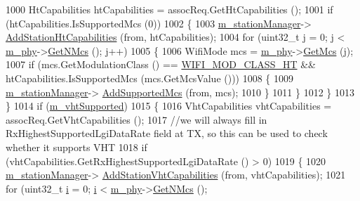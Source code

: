 \begin{DoxyCode}
1000                       HtCapabilities htCapabilities = assocReq.GetHtCapabilities ();
1001                       \textcolor{keywordflow}{if} (htCapabilities.IsSupportedMcs (0))
1002                         \{
1003                           \hyperlink{classns3_1_1RegularWifiMac_a76d1a5e27b64bfe36f24a55d1eea2775}{m\_stationManager}->
      \hyperlink{classns3_1_1WifiRemoteStationManager_ae78d843a98a66ff2d8584da8ed189b4d}{AddStationHtCapabilities} (from, htCapabilities);
1004                           \textcolor{keywordflow}{for} (uint32\_t j = 0; j < \hyperlink{classns3_1_1RegularWifiMac_a1a6dad8eb0a057a4e1b459f518457a4c}{m\_phy}->\hyperlink{classns3_1_1WifiPhy_aede1b3de380510e387aaafcfda7a0db0}{GetNMcs} (); j++)
1005                             \{
1006                               WifiMode mcs = \hyperlink{classns3_1_1RegularWifiMac_a1a6dad8eb0a057a4e1b459f518457a4c}{m\_phy}->\hyperlink{classns3_1_1WifiPhy_a6a8740a6fbb7ff618c80e0a0867467fd}{GetMcs} (j);
1007                               \textcolor{keywordflow}{if} (mcs.GetModulationClass () == \hyperlink{namespacens3_aa999e1221606a2b21b1eb33c2007c217a6ac45cac36cc4454649435d24ebf349c}{WIFI\_MOD\_CLASS\_HT} && 
      htCapabilities.IsSupportedMcs (mcs.GetMcsValue ()))
1008                                 \{
1009                                   \hyperlink{classns3_1_1RegularWifiMac_a76d1a5e27b64bfe36f24a55d1eea2775}{m\_stationManager}->
      \hyperlink{classns3_1_1WifiRemoteStationManager_a4fd51c027afacdfa7225346d6d88c6b3}{AddSupportedMcs} (from, mcs);
1010                                 \}
1011                             \}
1012                         \}
1013                     \}
1014                   \textcolor{keywordflow}{if} (\hyperlink{classns3_1_1RegularWifiMac_a151f330fdeb3f83f9ec7cf07537f0e86}{m\_vhtSupported})
1015                     \{
1016                       VhtCapabilities vhtCapabilities = assocReq.GetVhtCapabilities ();
1017                       \textcolor{comment}{//we will always fill in RxHighestSupportedLgiDataRate field at TX, so this can be
       used to check whether it supports VHT}
1018                       \textcolor{keywordflow}{if} (vhtCapabilities.GetRxHighestSupportedLgiDataRate () > 0)
1019                         \{
1020                           \hyperlink{classns3_1_1RegularWifiMac_a76d1a5e27b64bfe36f24a55d1eea2775}{m\_stationManager}->
      \hyperlink{classns3_1_1WifiRemoteStationManager_a52b9e283f99e113cba95afbc2acea72b}{AddStationVhtCapabilities} (from, vhtCapabilities);
1021                           \textcolor{keywordflow}{for} (uint32\_t \hyperlink{bernuolliDistribution_8m_a6f6ccfcf58b31cb6412107d9d5281426}{i} = 0; \hyperlink{bernuolliDistribution_8m_a6f6ccfcf58b31cb6412107d9d5281426}{i} < \hyperlink{classns3_1_1RegularWifiMac_a1a6dad8eb0a057a4e1b459f518457a4c}{m\_phy}->\hyperlink{classns3_1_1WifiPhy_aede1b3de380510e387aaafcfda7a0db0}{GetNMcs} (); 

\end{DoxyCode}
